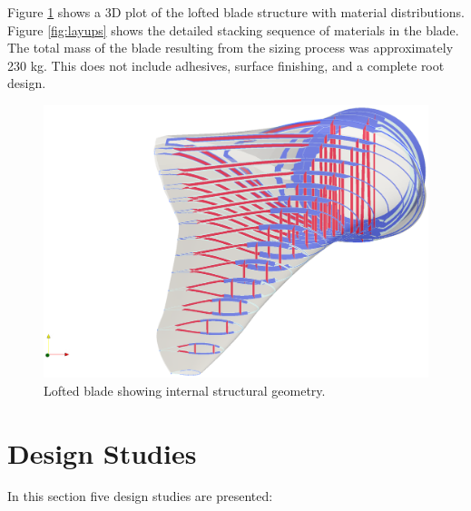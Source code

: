 Figure \ref{fig:loftedstructure_baseline} shows a 3D plot of the lofted blade structure with material distributions.
Figure \ref{fig:layups} shows the detailed stacking sequence of materials in the blade.
The total mass of the blade resulting from the sizing process was approximately 230 kg.
This does not include adhesives, surface finishing, and a complete root design.

\begin{figure}[!ht]
\begin{center}
	\includegraphics[width=1\linewidth]{figures/loftedbladestructure_basic_sizing.eps}
\end{center}
\caption{Lofted blade showing internal structural geometry.}
\label{fig:loftedstructure_baseline}
\end{figure}

\clearpage
\section{Design Studies}

In this section five design studies are presented:

